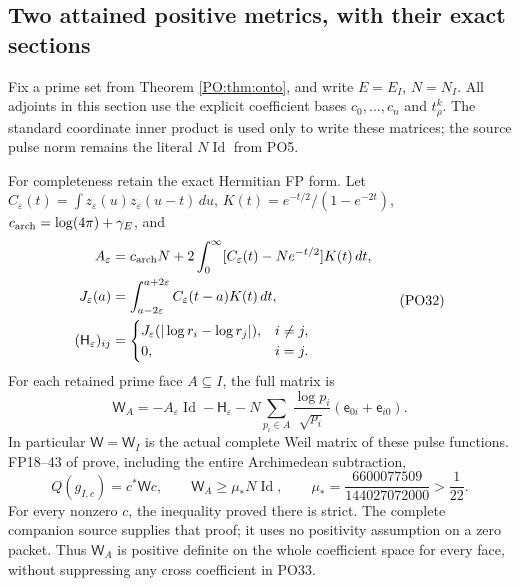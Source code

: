 \subsection{Two attained positive metrics, with their exact sections}

Fix a prime set from Theorem \ref{PO:thm:onto}, and write
\(E=E_I\), \(N=N_I\). All adjoints in this section use the
explicit coefficient bases \(c_0,\ldots,c_n\) and
\(t_\rho^k\). The standard coordinate inner product is used
only to write these matrices; the source pulse norm remains
the literal \(N\operatorname{Id}\) from PO5.

For completeness retain the exact Hermitian FP form.
Let \(C_\varepsilon(t)=\int z_\varepsilon(u)z_\varepsilon(u-t)\,du\),
\(K(t)=e^{-t/2}/(1-e^{-2t})\),
\(c_{\rm arch}=\log(4\pi)+\gamma_E\), and
\[
 \begin{aligned}
 A_\varepsilon&=c_{\rm arch}N+
       2\int_0^\infty[C_\varepsilon(t)-Ne^{-t/2}]K(t)\,dt,\\
 J_\varepsilon(a)&=\int_{a-2\varepsilon}^{a+2\varepsilon}C_\varepsilon(t-a)K(t)\,dt,\\
 (\mathsf H_\varepsilon)_{ij}
   &=\begin{cases}J_\varepsilon(|\log r_i-\log r_j|),&i\ne j,\\0,&i=j.\end{cases}
 \end{aligned}
 \tag{PO32}
\]
For each retained prime face \(A\subseteq I\), the full matrix is
\[
 \mathsf W_A=-A_\varepsilon\operatorname{Id}-\mathsf H_\varepsilon
    -N\sum_{p_i\in A}\frac{\log p_i}{\sqrt{p_i}}
                         (\mathsf e_{0i}+\mathsf e_{i0}).
 \tag{PO33}\label{PO:po:FPmatrix}
\]
In particular \(\mathsf W=\mathsf W_I\) is the actual complete
Weil matrix of these pulse functions. FP18--43 of \cite{PO:FP}
prove, including the entire Archimedean subtraction,
\[
 Q(g_{I,c})=c^*\mathsf Wc,\qquad
 \mathsf W_A\ge\mu_*N\operatorname{Id},\qquad
 \mu_*=\frac{6600077509}{144027072000}>\frac1{22}.
 \tag{PO34}\label{PO:po:coercive}
\]
For every nonzero \(c\), the inequality proved there is strict.
The complete companion source supplies that proof; it uses no
positivity assumption on a zero packet.
Thus \(\mathsf W_A\) is positive definite on the whole
coefficient space for every face, without suppressing any
cross coefficient in PO33.

